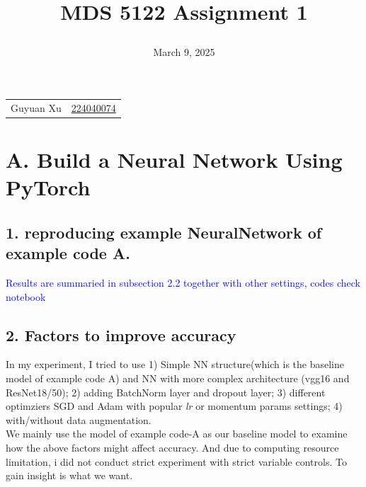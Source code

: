 \documentclass{article}
\newcommand{\subs}[1]{\subsection*{#1}}
\newcommand{\secs}[1]{\section*{#1}}
\begin{document}
\title{\raggedright MDS 5122 Assignment 1}
\date{March 9, 2025}
\maketitle

\noindent\begin{tabular}{@{}ll}
   Guyuan Xu &\href{mailto:224040074@link.cuhk.edu.cn}{224040074} \\
    
%
\end{tabular}

\secs{A. Build a Neural Network Using PyTorch}
\subs{1. reproducing example NeuralNetwork of example code A.}
\textcolor{blue}{Results are summaried in subsection 2.2 together with other settings, codes check notebook}

\subs{2. Factors to improve accuracy}
In my experiment, I tried to use 1) Simple NN structure(which is the baseline model of example code A) and NN with more complex architecture (vgg16 and ResNet18/50); 2) adding BatchNorm layer and dropout layer; 3) different optimziers SGD and Adam with popular \textit{lr} or momentum params settings; 4) with/without data augmentation. \\

We mainly use the model of example code-A as our baseline model to examine how the above factors might affect accuracy. And due to computing resource limitation, i did not conduct strict experiment with strict variable controls. To gain insight is what we want.\\


\end{document}
